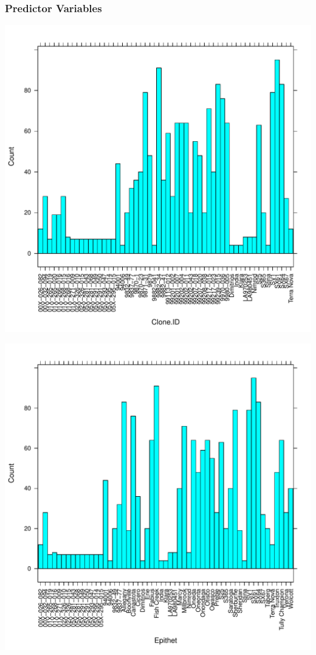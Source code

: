 \documentclass{article}\usepackage[]{graphicx}\usepackage[]{color}
\makeatletter
\def\maxwidth{ %
  \ifdim\Gin@nat@width>\linewidth
    \linewidth
  \else
    \Gin@nat@width
  \fi
}
\newenvironment{knitrout}{}{} %
\makeatother
\begin{document}
\newpage

\subsubsection*{Predictor Variables} 


\begin{knitrout}
\color{fgcolor}

{\centering \includegraphics[width=\maxwidth]{figure/HistogramsPredictorVariables-1} 

}




{\centering \includegraphics[width=\maxwidth]{figure/HistogramsPredictorVariables-2} 

}
\end{knitrout}
\end{document}

